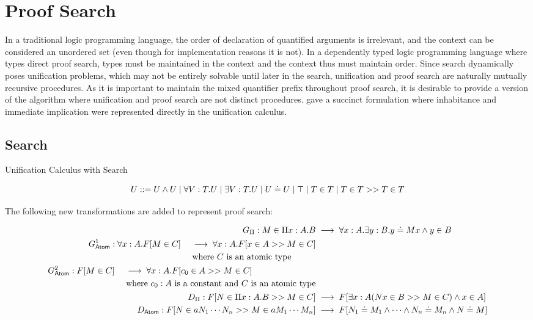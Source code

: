 \section{Proof Search}

In a traditional logic programming language, the order of declaration of quantified arguments is irrelevant, 
and the context can be considered an unordered set (even though for implementation reasons it is not). 
In a dependently typed logic programming language where types direct proof search, types must be maintained in the context
and the context thus must maintain order.   Since search dynamically poses unification problems, which may not be 
entirely solvable until later in the search, unification and proof search are naturally mutually recursive procedures.
As it is important to maintain the mixed quantifier prefix throughout proof search, it is desirable to provide a version 
of the algorithm where unification and proof search are not distinct procedures. 
\citep{pfenning1991logic} gave a succinct formulation where inhabitance and immediate implication were represented
directly in the unification calculus.  

\subsection{Search}

\begin{definition}
Unification Calculus with Search

\[
U ::= U \wedge U 
 \; | \; \forall V : T . U
 \; | \; \exists V : T . U 
 \; | \; U \doteq U
 \; | \; \top
  \; | \; T \in T 
  \; | \; T \in T >> T \in T
\]

\end{definition}

The following new transformations are added to represent proof search:

\begin{align}
G_\Pi : M \in \Pi x : A . B   &\;\longrightarrow\; \forall x : A . \exists y : B . y \doteq M x \wedge y \in B
\\
\begin{split}
G^1_{\mathsf{Atom}} : \forall x : A . F[M\in C]  &\quad\;\longrightarrow\; \forall x : A . F[x \in A >> M \in C]
\\
&\quad\text{ where $C$ is an atomic type}
\end{split}
\\
\begin{split}
G^2_{\mathsf{Atom}} : F[M\in C] &\quad\;\longrightarrow\;\forall x : A . F[c_0 \in A >> M \in C]
\\
&\quad\text{ where $c_0 : A$ is a constant and $C$ is an atomic type}
\end{split}
\\
D_\Pi : 
F[N\in \Pi x : A . B >> M \in C ]
&\;\longrightarrow\; 
F[\exists x : A ( N x \in B >> M \in C) \wedge x \in A]
\\
D_{\mathsf{Atom}} : 
F[N\in a N_1 \cdots N_n >> M \in a M_1 \cdots M_n] 
&\;\longrightarrow\; 
F[N_1 \doteq M_1 \wedge \cdots \wedge N_n \doteq M_n \wedge N \doteq M]
\end{align}


